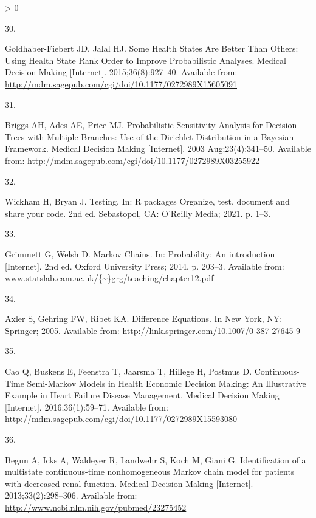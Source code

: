 \documentclass[
]{article}
\newlength{\cslhangindent}
\newlength{\csllabelwidth}
\newenvironment{CSLReferences}[2] %
 {%
  \setlength{\parindent}{0pt}
  \ifodd #1 \everypar{\setlength{\hangindent}{\cslhangindent}}\ignorespaces\fi
  \ifnum #2 > 0
  \setlength{\parskip}{#2\baselineskip}
  \fi
 }%
 {}
\newcommand{\CSLLeftMargin}[1]{\parbox[t]{\csllabelwidth}{#1}}
\newcommand{\CSLRightInline}[1]{\parbox[t]{\linewidth - \csllabelwidth}{#1}\break}
\begin{document}
\begin{CSLReferences}{0}{0}
\leavevmode\hypertarget{ref-Goldhaber-Fiebert2015}{}%
\CSLLeftMargin{30. }
\CSLRightInline{Goldhaber-Fiebert JD, Jalal HJ. {Some Health States Are Better Than Others: Using Health State Rank Order to Improve Probabilistic Analyses}. Medical Decision Making {[}Internet{]}. 2015;36(8):927--40. Available from: \url{http://mdm.sagepub.com/cgi/doi/10.1177/0272989X15605091}}

\leavevmode\hypertarget{ref-Briggs2003}{}%
\CSLLeftMargin{31. }
\CSLRightInline{Briggs AH, Ades AE, Price MJ. {Probabilistic Sensitivity Analysis for Decision Trees with Multiple Branches: Use of the Dirichlet Distribution in a Bayesian Framework}. Medical Decision Making {[}Internet{]}. 2003 Aug;23(4):341--50. Available from: \url{http://mdm.sagepub.com/cgi/doi/10.1177/0272989X03255922}}

\leavevmode\hypertarget{ref-Wickham2021}{}%
\CSLLeftMargin{32. }
\CSLRightInline{Wickham H, Bryan J. {Testing}. In: R packages Organize, test, document and share your code. 2nd ed. Sebastopol, CA: O'Reilly Media; 2021. p. 1--3. }

\leavevmode\hypertarget{ref-Grimmett2014}{}%
\CSLLeftMargin{33. }
\CSLRightInline{Grimmett G, Welsh D. {Markov Chains}. In: Probability: An introduction {[}Internet{]}. 2nd ed. Oxford University Press; 2014. p. 203--3. Available from: \href{https://www.statslab.cam.ac.uk/\%7B~\%7Dgrg/teaching/chapter12.pdf}{www.statslab.cam.ac.uk/\{\textasciitilde\}grg/teaching/chapter12.pdf}}

\leavevmode\hypertarget{ref-Axler2005}{}%
\CSLLeftMargin{34. }
\CSLRightInline{Axler S, Gehring FW, Ribet KA. {Difference Equations}. In New York, NY: Springer; 2005. Available from: \url{http://link.springer.com/10.1007/0-387-27645-9}}

\leavevmode\hypertarget{ref-Cao2016}{}%
\CSLLeftMargin{35. }
\CSLRightInline{Cao Q, Buskens E, Feenstra T, Jaarsma T, Hillege H, Postmus D. {Continuous-Time Semi-Markov Models in Health Economic Decision Making: An Illustrative Example in Heart Failure Disease Management}. Medical Decision Making {[}Internet{]}. 2016;36(1):59--71. Available from: \url{http://mdm.sagepub.com/cgi/doi/10.1177/0272989X15593080}}

\leavevmode\hypertarget{ref-Begun2013}{}%
\CSLLeftMargin{36. }
\CSLRightInline{Begun A, Icks A, Waldeyer R, Landwehr S, Koch M, Giani G. {Identification of a multistate continuous-time nonhomogeneous Markov chain model for patients with decreased renal function.} Medical Decision Making {[}Internet{]}. 2013;33(2):298--306. Available from: \url{http://www.ncbi.nlm.nih.gov/pubmed/23275452}}


\end{CSLReferences}
\end{document}
